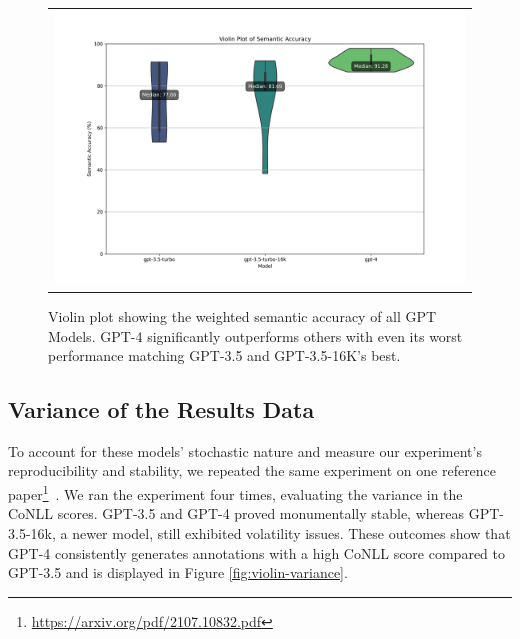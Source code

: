 \begin{figure}[htpb]
  \centering
  \begin{tabular}{c}
  \includegraphics[width=14cm]{images/semantic-accuracy.png}
  \end{tabular}
  \caption[Semantic Accuracy]{Violin plot showing the weighted semantic accuracy of all GPT Models. GPT-4 significantly outperforms others with even its worst performance matching GPT-3.5 and GPT-3.5-16K's best.}\label{fig:violin-semantic}
\end{figure}

\subsection{Variance of the Results Data}

To account for these models' stochastic nature and measure our experiment's reproducibility and stability, we repeated the same experiment on one reference paper\footnote{\url{https://arxiv.org/pdf/2107.10832.pdf}}~\citep{singleton2021logic}. We ran the experiment four times, evaluating the variance in the CoNLL scores. GPT-3.5 and GPT-4 proved monumentally stable, whereas GPT-3.5-16k, a newer model, still exhibited volatility issues. These outcomes show that GPT-4 consistently generates annotations with a high CoNLL score compared to GPT-3.5 and is displayed in Figure \ref{fig:violin-variance}.

